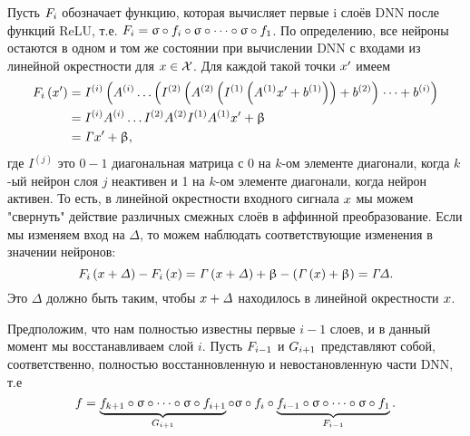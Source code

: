 Пусть $\mathnormal{F}_{i}$ обозначает функцию, которая вычисляет первые i слоёв DNN после функций ReLU, т.е. $\mathnormal{F}_{i} = \sigma \circ  \mathnormal{f}_{i} \circ \sigma \circ \dots \circ \sigma \circ  \mathnormal{f}_{1}$. По определению, все нейроны остаются в одном и том же состоянии при вычислении DNN с входами из линейной окрестности для $\mathnormal{x} \in \mathcal{X}$. Для каждой такой точки $\mathnormal{x}'$ имеем
\begin{align*}
\mathnormal{F}_{i} \left( \mathnormal{x}' \right)  &= I^{\left( i \right)} \left(A^{\left( i \right)} \dots \left( I^{\left( 2 \right)} \left( A^{\left( 2 \right)} \left ( I ^{\left( 1 \right)} \left (A^{\left( 1 \right)} \mathnormal{x}' + \mathnormal{b}^{\left( 1 \right)} \right) \right) + \mathnormal{b}^{\left( 2 \right)} \right) \right.  \dots + \mathnormal{b}^{\left( i \right)}\right)\\
&= I^{\left( i \right)} A^{\left( i \right)} \dots I^{\left( 2 \right)} A^{\left( 2 \right)} I^{\left( 1 \right)} A^{\left( 1 \right)} \mathnormal{x}' + \beta\\
&=\mathit{\Gamma} \mathnormal{x}' + \mathit{\beta},
\end{align*}
где $I^{\left(j \right)}$ это $0 - 1$ диагональная матрица с 0 на $k$-ом элементе диагонали, когда $k$-ый нейрон слоя $j$ неактивен и 1 на $k$-ом элементе диагонали, когда нейрон активен. То есть, в линейной окрестности входного сигнала $\mathnormal{x}$ мы можем "свернуть" действие различных смежных слоёв в аффинной преобразование. Если мы изменяем вход на $\mathit{\Delta}$, то можем наблюдать соответствующие изменения в значении нейронов:
$$\mathnormal{F}_{i} \left( \mathnormal{x} + \mathit{\Delta} \right) - \mathnormal{F}_{i} \left( \mathnormal{x} \right) = \mathit{\Gamma} \left(\mathnormal{x} + \mathit{\Delta} \right) + \beta - \left(\mathit{\Gamma} \left(\mathnormal{x}\right) + \beta\right) = \mathit{\Gamma}\mathit{\Delta}.$$
Это $\mathit{\Delta}$ должно быть таким, чтобы $\mathnormal{x} + \mathit{\Delta}$ находилось в линейной окрестности $\mathnormal{x}$.

Предположим, что нам полностью известны первые $i-1$ слоев, и в данный момент мы восстанавливаем слой $i$. Пусть $\mathnormal{F}_{i-1}$ и $\mathnormal{G}_{i+1}$ представляют собой, соответственно, полностью восстанновленную и невостановленную части DNN, т.е
$$ \mathnormal{f} = \underbrace{\mathnormal{f}_{k+1} \circ \sigma \circ \dots \circ \sigma \circ  \mathnormal{f}_{i+1}}_{\mathnormal{G}_{i+1}} \circ \sigma \circ \mathnormal{f}_{i} \circ \underbrace{\mathnormal{f}_{i-1} \circ \sigma \circ \dots \circ \sigma \circ  \mathnormal{f}_{1}}_{\mathnormal{F}_{i-1}}.$$


